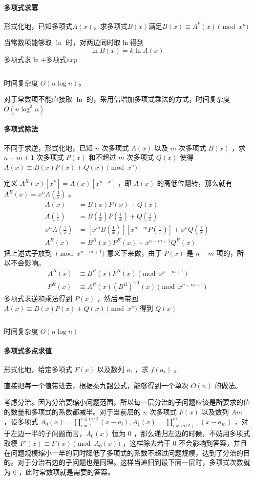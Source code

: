 \documentclass[UTF-8]{ctexart}
\newcommand{\cpp}[1]{\inputminted[bgcolor=bg,breaklines,breakanywhere=true]{c++}{#1}}
\begin{document}
			\paragraph{多项式求幂} 形式化地，已知多项式$A(x)$，求多项式$B(x)$满足$B(x) \equiv A^k(x) \pmod{x^n}$  
			
			当常数项能够取 $\ln$ 时，对两边同时取$\ln$得到
			$$\ln{B(x)}=k \ln{A(x)}$$
			多项式求$\ln$+多项式$exp$
			\cpp{code//Math//polypow.cpp}
			时间复杂度 $O(n\log n)$。
			
			对于常数项不能直接取 $\ln$ 的，采用倍增加多项式乘法的方式，时间复杂度 $O(n\log^2 n)$
			\paragraph{多项式除法} 不同于求逆，形式化地，已知 $n$ 次多项式 $A(x)$ 以及 $m$ 次多项式 $B(x)$ ，求 $n-m+1$ 次多项式 $P(x)$ 和不超过 $m$ 次多项式 $Q(x)$ 使得 $A(x)\equiv B(x)P(x)+Q(x) \pmod{x^n}$
			
			定义 $A^R(x)[x^k]=A(x)[x^{n-k}]$ ，即 $A(x)$ 的高低位翻转，那么就有 $A^R(x)=x^nA(\frac{1}{x})$ 。
			\begin{align}
			A(x)&=B(x)P(x)+Q(x)\nonumber \\
			A(\frac{1}{x})&=B(\frac{1}{x})P(\frac{1}{x})+Q(\frac{1}{x})\nonumber \\
			x^nA(\frac{1}{x})&=[x^mB(\frac{1}{x})][x^{n-m}P(\frac{1}{x})]+x^nQ(\frac{1}{x})\nonumber\\A^R(x)&=B^R(x)P^R(x)+x^{n-m+1}Q^R(x)\nonumber
			\end{align}
			把上述式子放到 $\pmod{x^{n-m+1}}$ 意义下来做，由于 $P(x)$ 是 $n-m$ 项的，所以不会影响。
			\begin{align}
			A^R(x)&\equiv B^R(x)P^R(x) \pmod{x^{n-m+1}}\nonumber\\
			P^R(x)&\equiv A^R(x) (B^R)^{-1}(x) \pmod{x^{n-m+1}}\nonumber
			\end{align}
			多项式求逆和乘法得到 $P(x)$ ，然后再带回 $A(x)\equiv B(x)P(x)+Q(x) \pmod{x^n}$ 得到 $Q(x)$
			\cpp{code//Math//polymod.cpp}
			时间复杂度 $O(n\log n)$
			\paragraph{多项式多点求值} 形式化地，给定多项式 $F(x)$ 以及数列 $a _ i$ ，求 $f(a_i)$ 。
			
			直接把每一个值带进去，根据秦九韶公式，能够得到一个单次 $O(n)$ 的做法。
			
			考虑分治。因为分治要缩小问题范围，所以每一层分治的子问题应该是所要求的值的数量和多项式的系数都减半。对于当前层的 $n$ 次多项式 $F(x)$ 以及数列 $Am$ ，设多项式 $A_0(x)=\prod _ {i=1} ^ {i \le m/2} (x-a _ i),A_1(x)=\prod_ {i=m/2+1}^m (x-a_m)$ ，对于左边一半的子问题而言，$A_0(x)$ 恒为 $0$ ，那么递归左边的时候，不妨用多项式取模 $F'(x) \equiv F(x) \pmod{A_0(x)}$ ，这样除去若干 $0$ 不会影响到答案，并且在问题规模缩小一半的同时降低了多项式的系数不超过问题规模，达到了分治的目的。对于分治右边的子问题也是同理。这样当递归到最下面一层时，多项式次数就为 $0$ ，此时常数项就是需要的答案。
			
\end{document}
